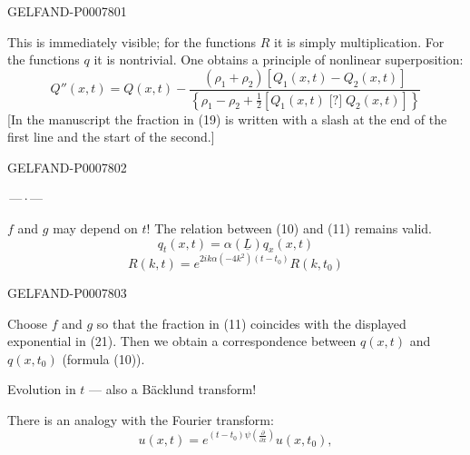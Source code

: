\begin{GelfandAdjacentEvidence}{GELFAND-P000780}{1}

This is immediately visible; for the functions \(R\) it is simply multiplication.
For the functions \(q\) it is nontrivial.
One obtains a principle of nonlinear superposition:
\begin{equation}
Q''(x,t)=Q(x,t)-
\frac{(\rho_1+\rho_2)[Q_1(x,t)-Q_2(x,t)]}
{\left\{\rho_1-\rho_2+\tfrac12[Q_1(x,t)\mathbin{\text{[?]}}Q_2(x,t)]\right\}}
\tag{19}
\end{equation}
[In the manuscript the fraction in (19) is written with a slash at the end of the first line and the start of the second.]
\end{GelfandAdjacentEvidence}
\begin{GelfandAdjacentEvidence}{GELFAND-P000780}{2}


\begin{center}\(\text{---}\,\cdot\,\text{---}\)\end{center}

\(f\) and \(g\) may depend on \(t\)!
The relation between (10) and (11) remains valid.
\begin{equation}
q_t(x,t)=\alpha(\underline L)q_x(x,t)\tag{20}
\end{equation}
\begin{equation}
R(k,t)=e^{2ik\alpha(-4k^2)(t-t_0)}R(k,t_0)\tag{21}
\end{equation}
\end{GelfandAdjacentEvidence}
\begin{GelfandAdjacentEvidence}{GELFAND-P000780}{3}


Choose \(f\) and \(g\) so that the fraction in (11) coincides with the displayed exponential in (21).
Then we obtain a correspondence between \(q(x,t)\) and \(q(x,t_0)\) (formula (10)).

Evolution in \(t\) --- also a Bäcklund transform!

There is an analogy with the Fourier transform:
\[
u(x,t)=e^{(t-t_0)\psi(\frac{\partial}{\partial x})}u(x,t_0),
\]
\end{GelfandAdjacentEvidence}
